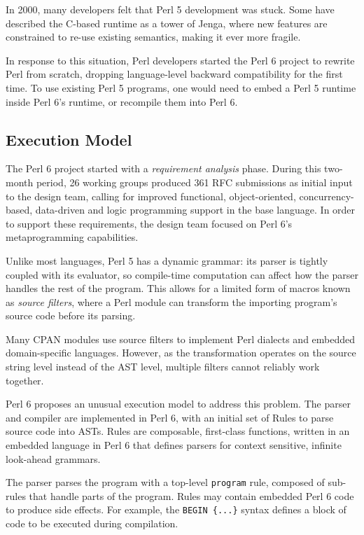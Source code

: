 \documentclass[]{sigplanconf}
\newcommand{\code}[1]{\texttt{#1}}
\begin{document}
In 2000, many developers felt that Perl 5 development was stuck.  Some have
described the C-based runtime as a tower of Jenga, where new features are
constrained to re-use existing semantics, making it ever more fragile.

In response to this situation, Perl developers started the Perl 6 project to
rewrite Perl from scratch, dropping language-level backward compatibility for
the first time.  To use existing Perl 5 programs, one would need to embed a
Perl 5 runtime inside Perl 6's runtime, or recompile them into Perl 6.

\subsection{Execution Model}
\label{sec:ExecutionModel}

The Perl 6 project started with a \emph{requirement analysis} phase.  During
this two-month period, 26 working groups produced 361 RFC submissions as
initial input to the design team, calling for improved functional,
object-oriented, concurrency-based, data-driven and logic programming support
in the base language.  In order to support these requirements, the design team
focused on Perl 6's metaprogramming capabilities.

Unlike most languages, Perl 5 has a dynamic grammar: its parser is tightly
coupled with its evaluator, so compile-time computation can affect how the
parser handles the rest of the program.  This allows for a limited form of
macros known as \emph{source filters}, where a Perl module can transform the
importing program's source code before its parsing.

Many CPAN modules use source filters to implement Perl dialects and embedded
domain-specific languages.  However, as the transformation operates on the
source string level instead of the AST level, multiple filters cannot reliably
work together.

Perl 6 proposes an unusual execution model to address this problem.  The parser
and compiler are implemented in Perl 6, with an initial set of Rules to parse
source code into ASTs.  Rules are composable, first-class functions, written in
an embedded language in Perl 6 that defines parsers for context sensitive,
infinite look-ahead grammars.

The parser parses the program with a top-level \code{program} rule, composed of
sub-rules that handle parts of the program.  Rules may contain embedded Perl 6
code to produce side effects.  For example, the \code{BEGIN \{...\}} syntax
defines a block of code to be executed during compilation.
\end{document}
